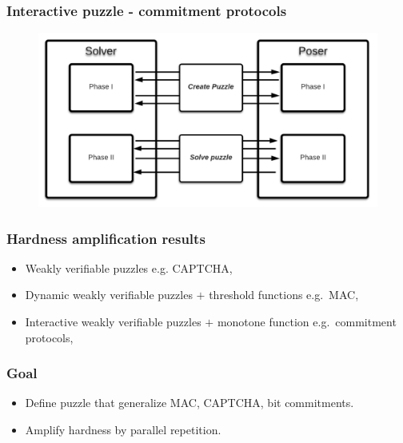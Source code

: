 \documentclass[first,firstsupp,notes, handout, last]{ETHclass}
\begin{document}
\begin{frame}[t]
  \frametitle{Interactive puzzle - commitment protocols}
  \begin{figure}
    \includegraphics[scale=0.43]{images/IntProtocol.pdf}
  \end{figure}
\end{frame}

\begin{frame}[t]
  \frametitle{Hardness amplification results}
  \begin{itemize}
    \item<1-3> Weakly verifiable puzzles e.g. CAPTCHA, \cite{canetti2005hardness}
    \item<2-3> Dynamic weakly verifiable puzzles $+$ threshold functions e.g.~MAC,\cite{dodis2009security}
    \item<3> Interactive weakly verifiable puzzles $+$ monotone function e.g.~commitment protocols, \cite{holenstein2011general}
  \end{itemize}
  \centering
\end{frame}

\begin{frame}[t]
  \frametitle{Goal}
  \begin{itemize}
    \item Define puzzle that generalize MAC, CAPTCHA, bit commitments.
    \item Amplify hardness by parallel repetition.
  \end{itemize}
  \vspace{40pt}
  \begin{figure}
    \centering
  \end{figure}
\end{frame}
\end{document}
